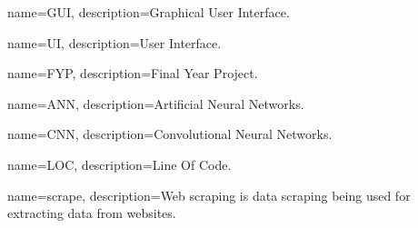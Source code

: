 {
        name=GUI,
        description={Graphical User Interface.}
}

{
        name=UI,
        description={User Interface.}
}

{
        name=FYP,
        description={Final Year Project.}
}

{
        name=ANN,
        description={Artificial Neural Networks.}
}

{
        name=CNN,
        description={Convolutional Neural Networks.}
}

{
        name=LOC,
        description={Line Of Code.}
}

{
        name=scrape,
        description={Web scraping is data scraping being used for extracting data from websites.}
}

% 
